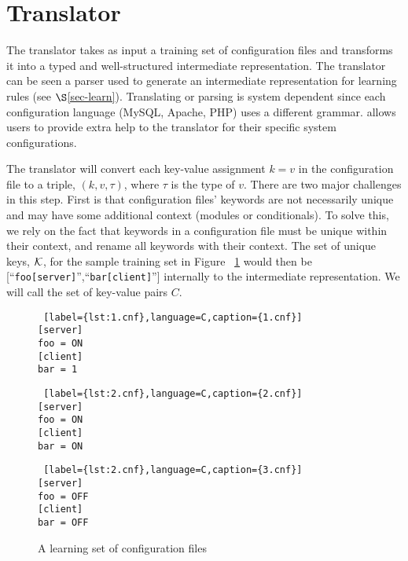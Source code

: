 
\section{Translator}
\label{sec:trans}

The translator takes as input a training set of configuration files and transforms it into a typed and well-structured intermediate representation.
The translator can be seen a parser used to generate an intermediate representation for learning rules (see $\S$\ref{sec-learn}).
Translating or parsing is system dependent since each configuration language (MySQL, Apache, PHP) uses a different grammar.
\app allows users to provide extra help to the translator for their specific system configurations.

The translator will convert each key-value assignment $k=v$ in the configuration file to a triple, $(k, v, \tau)$, where $\tau$ is the type of $v$. 
There are two major challenges in this step.
First is that configuration files' keywords are not necessarily unique and may have some additional context (modules or conditionals).
To solve this, we rely on the fact that keywords in a configuration file must be unique within their context, and rename all keywords with their context.
The set of unique keys, $\mathcal{K}$, for the sample training set in Figure ~\ref{fig:tset} would then be [``{\tt foo[server]}'',``{\tt bar[client]}''] internally to the intermediate representation.
We will call the set of key-value pairs $C$.

{
\setlength{\belowcaptionskip}{-15pt}
\begin{figure}[!htb]
    \centering
    \begin{minipage}{.25\textwidth}
	\begin{lstlisting} [label={lst:1.cnf},language=C,caption={1.cnf}]
[server]
foo = ON
[client]
bar = 1
	\end{lstlisting}
    \end{minipage}%
    \hspace{1cm}
    \begin{minipage}{0.25\textwidth}
	\begin{lstlisting} [label={lst:2.cnf},language=C,caption={2.cnf}]
[server]
foo = ON
[client]
bar = ON
	\end{lstlisting}
    \end{minipage}
    \hspace{1cm}
    \begin{minipage}{0.25\textwidth}
	\begin{lstlisting} [label={lst:2.cnf},language=C,caption={3.cnf}]
[server]
foo = OFF
[client]
bar = OFF
	\end{lstlisting}
    \end{minipage}
    \caption{A learning set of configuration files}
    \label{fig:tset}
\end{figure}
}

